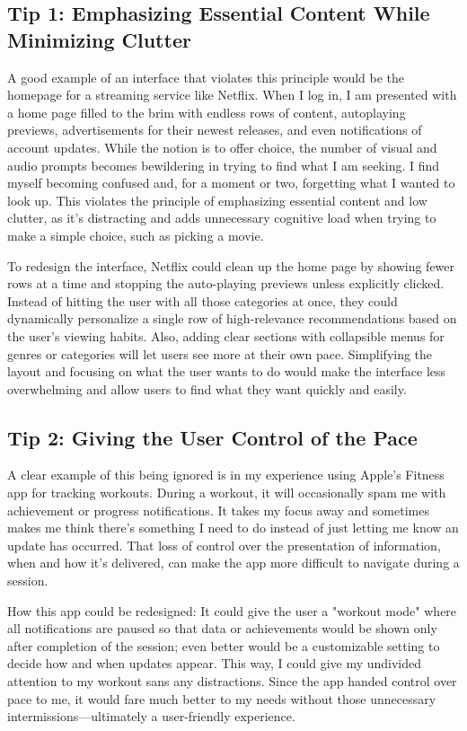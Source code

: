 \documentclass[
	letterpaper, %
]{jdf}
\begin{document}
\subsection {Tip 1: Emphasizing Essential Content While Minimizing Clutter}

A good example of an interface that violates this principle would be the homepage for a streaming service like Netflix. When I log in, I am presented with a home page filled to the brim with endless rows of content, autoplaying previews, advertisements for their newest releases, and even notifications of account updates. While the notion is to offer choice, the number of visual and audio prompts becomes bewildering in trying to find what I am seeking. I find myself becoming confused and, for a moment or two, forgetting what I wanted to look up. This violates the principle of emphasizing essential content and low clutter, as it's distracting and adds unnecessary cognitive load when trying to make a simple choice, such as picking a movie.

To redesign the interface, Netflix could clean up the home page by showing fewer rows at a time and stopping the auto-playing previews unless explicitly clicked. Instead of hitting the user with all those categories at once, they could dynamically personalize a single row of high-relevance recommendations based on the user's viewing habits. Also, adding clear sections with collapsible menus for genres or categories will let users see more at their own pace. Simplifying the layout and focusing on what the user wants to do would make the interface less overwhelming and allow users to find what they want quickly and easily.

\subsection{Tip 2: Giving the User Control of the Pace}

A clear example of this being ignored is in my experience using Apple’s Fitness app for tracking workouts. During a workout, it will occasionally spam me with achievement or progress notifications. It takes my focus away and sometimes makes me think there's something I need to do instead of just letting me know an update has occurred. That loss of control over the presentation of information, when and how it's delivered, can make the app more difficult to navigate during a session.

How this app could be redesigned: It could give the user a "workout mode" where all notifications are paused so that data or achievements would be shown only after completion of the session; even better would be a customizable setting to decide how and when updates appear. This way, I could give my undivided attention to my workout sans any distractions. Since the app handed control over pace to me, it would fare much better to my needs without those unnecessary intermissions—ultimately a user-friendly experience.
\end{document}
